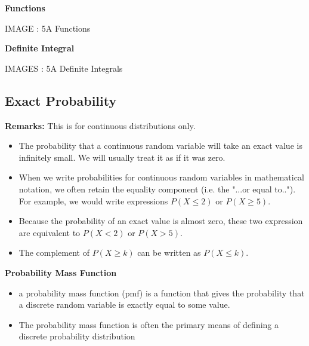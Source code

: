 \textbf{Functions}

IMAGE : 5A Functions



\textbf{Definite Integral}

IMAGES : 5A Definite Integrals







\subsection{Exact Probability}

\noindent\textbf{Remarks:} This is for continuous distributions only.
\begin{itemize}
\item The probability that a continuous random variable will take an exact value is infinitely small.
We will usually treat it as if it was zero.
\item
When we write probabilities for continuous random variables in mathematical notation, we often retain the equality component (i.e. the "...or equal to..").\\
For example, we would write expressions $P(X \leq 2)$ or $P(X \geq 5)$.
\item
Because the probability of an exact value is almost zero, these two expression are equivalent to $P(X < 2)$
or $P(X > 5)$. \item The complement of $P(X \geq k)$ can be written as $P(X \leq k)$.
\end{itemize}

{
\textbf{Probability Mass Function}

\begin{itemize} \item  a probability mass function (pmf) is a function that gives the probability that a discrete random variable is exactly equal to some value. \item  The probability mass function is often the primary means of defining a discrete probability distribution \end{itemize}
}




